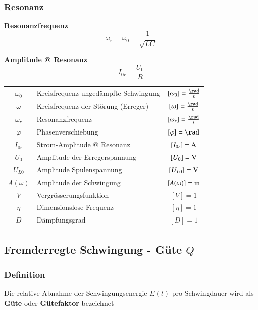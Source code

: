\subsubsection{Resonanz}

\begin{minipage}{0.48\linewidth}
\textbf{Resonanzfrequenz}
$$ \boxed{ \omega_r = \omega_0 = \frac{1}{\sqrt{LC}} } $$ 
\end{minipage}
\hfill
\begin{minipage}{0.48\linewidth}
\textbf{Amplitude @ Resonanz}
$$ \boxed{ I_{0r} = \frac{U_0}{R} } $$ 
\end{minipage}


\vspace{0.2cm}


\begin{tabular}{c l c}
\rule{0pt}{10pt} $\omega_0$ & Kreisfrequenz ungedämpfte Schwingung & $[\omega_0] = \frac{\rad}{\s}$ \\
\rule{0pt}{10pt} $\omega$ & Kreisfrequenz der Störung (Erreger) & $[\omega] = \frac{\rad}{\s}$ \\
\rule{0pt}{10pt} $\omega_r$ & Resonanzfrequenz & $[\omega_r] = \frac{\rad}{\s}$ \\
$\varphi$ & Phasenverschiebung & $[ \varphi] = \rad$ \\
$I_{0r}$ & Strom-Amplitude @ Resonanz & $[I_{0r}] = \mathrm{A}$ \\
$U_0$ & Amplitude der Erregerspannung & $[U_0] = \mathrm{V}$ \\
$U_{L0}$ & Amplitude Spulenspannung & $[U_{L0}] = \mathrm{V}$ \\
$A(\omega)$ & Amplitude der Schwingung & $[A(\omega)] = \mathrm{m}$ \\
$V$ & Vergrösserungsfunktion & $[V] = 1$ \\
$\eta$ & Dimensionslose Frequenz & $[\eta] = 1$  \\
$D$ & Dämpfungsgrad & $[D] = 1$ 
\end{tabular}





\subsection{Fremderregte Schwingung - Güte $Q$}
\subsubsection{Definition}

Die relative Abnahme der Schwingungsenergie $E(t)$ pro Schwingdauer wird als \textbf{Güte} oder \textbf{Gütefaktor} bezeichnet 

